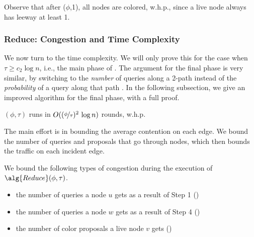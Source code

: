 Observe that after ($\phi$,1), all nodes are colored, w.h.p., since a live node always has leeway at least 1. 


\subsubsection{Reduce: Congestion and Time Complexity}
We now turn to the time complexity.
We will only prove this for the case when $\tau \ge c_2\log n$, i.e., the main phase of . The argument for the final phase is very similar, by switching to the \emph{number} of queries along a 2-path instead of the \emph{probability} of a query along that path . In the following subsection, we give an improved algorithm for the final phase, with a full proof.



\begin{theorem}
$(\phi,\tau)$ runs in $O((\nicefrac{\phi}{\tau})^2\, \log n)$ rounds, w.h.p.
\label{T:reduce-time}
\end{theorem}

The main effort is in bounding the average contention on each edge. We bound the number of queries and proposals that go through nodes, which then bounds the traffic on each incident edge.


We bound the following types of congestion during the execution of $\alg{Reduce}(\phi,\tau)$.
\begin{itemize}
    \item the number of queries a node $u$ gets as a result of Step 1 ()
    \item the number of queries a  node $w$ gets as a result of Step 4 ()
    \item the number of color proposals a live node $v$ gets ()
\end{itemize}



